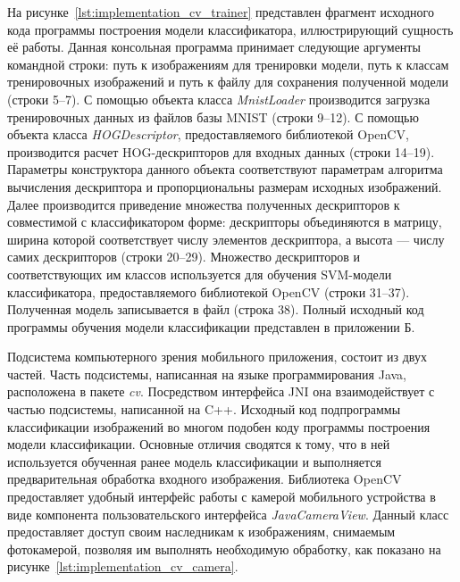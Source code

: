 На рисунке~\ref{lst:implementation_cv_trainer} представлен фрагмент
исходного кода программы построения модели классификатора,
иллюстрирующий сущность её работы.
Данная консольная программа принимает следующие аргументы командной
строки: путь к изображениям для тренировки модели,
путь к классам тренировочных изображений и
путь к файлу для сохранения полученной модели (строки 5--7).
С помощью объекта класса \textit{MnistLoader} производится загрузка
тренировочных данных из файлов базы MNIST (строки 9--12).
С помощью объекта класса \textit{HOGDescriptor}, предоставляемого
библиотекой OpenCV, производится расчет HOG-дескрипторов для
входных данных (строки 14--19). Параметры конструктора данного объекта
соответствуют параметрам алгоритма вычисления дескриптора
и пропорциональны размерам исходных изображений.
Далее производится приведение множества полученных дескрипторов
к совместимой с классификатором форме:
дескрипторы объединяются в матрицу, ширина которой
соответствует числу элементов дескриптора, а высота ---
числу самих дескрипторов (строки 20--29).
Множество дескрипторов и соответствующих им классов используется
для обучения SVM-модели классификатора, предоставляемого библиотекой
OpenCV (строки 31--37).
Полученная модель записывается в файл (строка 38).
Полный исходный код программы обучения модели классификации представлен
в приложении Б.



Подсистема компьютерного зрения мобильного приложения,
состоит из двух частей. Часть подсистемы, написанная на языке
программирования Java, расположена в пакете \textit{cv}. Посредством
интерфейса JNI она взаимодействует с частью подсистемы, написанной на C++.
Исходный код подпрограммы классификации изображений во многом
подобен коду программы построения модели классификации.
Основные отличия сводятся к тому,
что в ней используется обученная ранее модель классификации и
выполняется предварительная обработка входного изображения.
Библиотека OpenCV предоставляет удобный интерфейс работы с камерой
мобильного устройства в виде компонента пользовательского интерфейса
\textit{JavaCameraView}.
Данный класс предоставляет доступ своим наследникам
к изображениям, снимаемым фотокамерой, позволяя им выполнять
необходимую обработку, как показано на рисунке~\ref{lst:implementation_cv_camera}.



